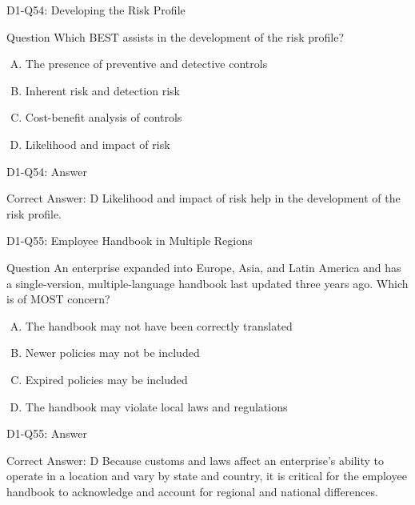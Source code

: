 \documentclass{beamer}
\begin{document}
	\begin{frame}{D1-Q54: Developing the Risk Profile}
		\begin{block}{Question}
			Which BEST assists in the development of the risk profile?
		\end{block}
		\begin{enumerate}[(A)]
			\item The presence of preventive and detective controls
			\item Inherent risk and detection risk
			\item Cost-benefit analysis of controls
			\item Likelihood and impact of risk
		\end{enumerate}
	\end{frame}
	\begin{frame}{D1-Q54: Answer}
		\begin{block}{Correct Answer: D}
			Likelihood and impact of risk help in the development of the risk profile.
		\end{block}
	\end{frame}
	
	\begin{frame}{D1-Q55: Employee Handbook in Multiple Regions}
		\begin{block}{Question}
			An enterprise expanded into Europe, Asia, and Latin America and has a single-version, multiple-language handbook last updated three years ago. Which is of MOST concern?
		\end{block}
		\begin{enumerate}[(A)]
			\item The handbook may not have been correctly translated
			\item Newer policies may not be included
			\item Expired policies may be included
			\item The handbook may violate local laws and regulations
		\end{enumerate}
	\end{frame}
	\begin{frame}{D1-Q55: Answer}
		\begin{block}{Correct Answer: D}
			Because customs and laws affect an enterprise's ability to operate in a location and vary by state and country, it is critical for the employee handbook to acknowledge and account for regional and national differences.
		\end{block}
	\end{frame}
	
\end{document}
